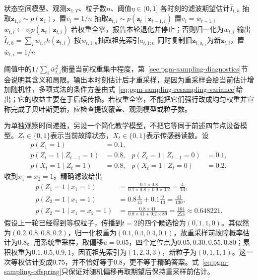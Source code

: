 \begin{algorithm}[带阈值重采样的自举粒子滤波]
  \label{alg:pgm-sampling-bootstrap}
  \begin{algorithmic}[1]
    \Require 状态空间模型、观测$\bm{x}_{1:T}$、粒子数$n$、阈值$\eta\in(0,1]$
    \Ensure 各时刻的滤波期望估计$\widehat I_{t,h}$
          \State 抽取$\bm{z}_{1,i}\sim p(\bm{z}_1)$，置$v_i=1/n$
        \Else
          \State 抽取$\bm{z}_{t,i}\sim p(\bm{z}_t\mid\bm{z}_{t-1,i})$
          \State 置$v_i=\bar w_{t-1,i}$
        \EndIf
        \State $w_{t,i}\gets v_i p(\bm{x}_t\mid\bm{z}_{t,i})$
      \EndFor
      \State 若权重全零，报告本轮退化并停止；否则归一化为$\bar w_{t,i}$
      \State 输出$\widehat I_{t,h}=\sum_i\bar w_{t,i}h(\bm{z}_{t,i})$
        \State 按$\bar w_{t,1:n}$抽取祖先索引$a_{t,1:n}$
        \State 同时复制旧$\bm{z}_{t,a_{t,i}}$为新$\bm{z}_{t,i}$，置$\bar w_{t,i}=1/n$
      \EndIf
    \EndFor
  \end{algorithmic}
\end{algorithm}

阈值中的$1/\sum_i\bar w_{t,i}^2$衡量当前权重集中程度，第~\ref{sec:pgm-sampling-diagnostics}节会说明其含义和局限。输出本时刻估计后才重采样，是因为重采样会给当前估计增加随机性，多项式法的条件方差由式~\eqref{eq:pgm-sampling-resampling-variance}给出；它的收益主要在于后续传播。若权重全零，不能把它们强行改成均匀权重并宣称完成了贝叶斯更新，应检查提议覆盖、观测模型或粒子数。

\begin{example}[二状态设备的粒子滤波]
  \label{ex:pgm-sampling-filter}
  为单独观察时间递推，另设一个简化教学模型，不把它等同于前述四节点设备模型。$Z_t\in\{0,1\}$表示当前故障状态，$X_t\in\{0,1\}$表示传感器读数。设
  \[
    \begin{aligned}
      p(Z_1=1)&=0.1,\\
      p(Z_t=1\mid Z_{t-1}=1)&=0.8,&
      p(Z_t=1\mid Z_{t-1}=0)&=0.1,\\
      p(X_t=1\mid Z_t=1)&=0.8,&
      p(X_t=1\mid Z_t=0)&=0.2.
    \end{aligned}
  \]
  收到$x_1=x_2=1$。精确滤波给出
  \[
    \begin{aligned}
      p(Z_1=1\mid x_1=1)&=\frac{0.1\times0.8}{0.1\times0.8+0.9\times0.2}
        =\frac4{13},\\
      p(Z_2=1\mid x_1=1)&=0.8\frac4{13}+0.1\frac9{13}
        =\frac{41}{130},\\
      p(Z_2=1\mid x_1=x_2=1)&=\frac{0.8\times41}{0.8\times41+0.2\times89}
        =\frac{164}{253}\approx0.648221.
    \end{aligned}
  \]
  假设上一轮已经得到等权粒子，传播到$t=2$的四个候选恰为$(0,1,1,0)$。其似然为$(0.2,0.8,0.8,0.2)$，归一化权重为$(0.1,0.4,0.4,0.1)$，故重采样前故障概率估计为$0.8$。用系统重采样，取偏移$u=0.05$，四个定位点为$0.05,0.30,0.55,0.80$；累积权重为$0.1,0.5,0.9,1$，因而祖先索引为$(1,2,3,3)$，新粒子为$(0,1,1,1)$。这一次等权估计变成$0.75$，并不恰好等于$0.8$，更不等于精确答案。式~\eqref{eq:pgm-sampling-offspring}只保证对随机偏移再取期望后保持重采样前估计。
\end{example}

